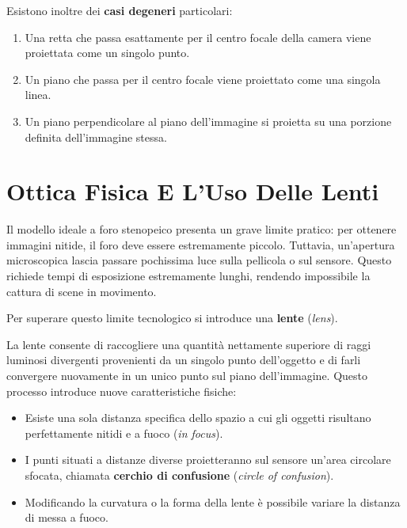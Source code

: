 ﻿\documentclass[11pt, a4paper]{article}
\begin{document}
Esistono inoltre dei \textbf{casi degeneri} particolari:
\begin{enumerate}[noitemsep]
    \item Una retta che passa esattamente per il centro focale della camera viene proiettata come un singolo punto.
    \item Un piano che passa per il centro focale viene proiettato come una singola linea.
    \item Un piano perpendicolare al piano dell'immagine si proietta su una porzione definita dell'immagine stessa.
\end{enumerate}

\newpage

\section{Ottica Fisica E L'Uso Delle Lenti}

Il modello ideale a foro stenopeico presenta un grave limite pratico: per ottenere immagini nitide, il foro deve essere estremamente piccolo. Tuttavia, un'apertura microscopica lascia passare pochissima luce sulla pellicola o sul sensore. Questo richiede tempi di esposizione estremamente lunghi, rendendo impossibile la cattura di scene in movimento.

Per superare questo limite tecnologico si introduce una \textbf{lente} (\emph{lens}).


La lente consente di raccogliere una quantità nettamente superiore di raggi luminosi divergenti provenienti da un singolo punto dell'oggetto e di farli convergere nuovamente in un unico punto sul piano dell'immagine. Questo processo introduce nuove caratteristiche fisiche:
\begin{itemize}[noitemsep]
    \item Esiste una sola distanza specifica dello spazio a cui gli oggetti risultano perfettamente nitidi e a fuoco (\emph{in focus}).
    \item I punti situati a distanze diverse proietteranno sul sensore un'area circolare sfocata, chiamata \textbf{cerchio di confusione} (\emph{circle of confusion}).
    \item Modificando la curvatura o la forma della lente è possibile variare la distanza di messa a fuoco.
\end{itemize}
\end{document}
